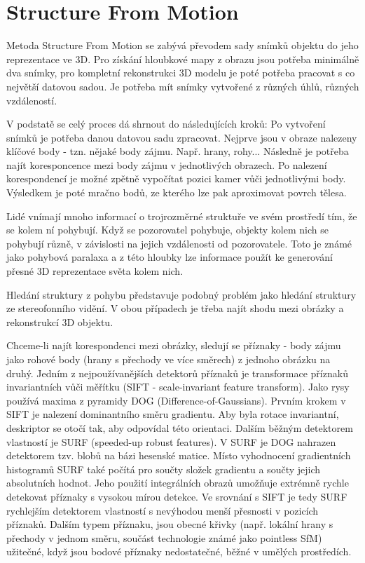 \section{Structure From Motion}
Metoda Structure From Motion se zabývá převodem sady snímků objektu do jeho reprezentace ve 3D. Pro získání hloubkové mapy z obrazu jsou potřeba minimálně dva snímky, pro kompletní rekonstrukci 3D modelu je poté potřeba pracovat s co největší datovou sadou. Je potřeba mít snímky vytvořené z různých úhlů, různých vzdáleností. \par
V podstatě se celý proces dá shrnout do následujících kroků: Po vytvoření snímků je potřeba danou datovou sadu zpracovat. Nejprve jsou v obraze nalezeny klíčové body - tzn. nějaké body zájmu. Např. hrany, rohy... Následně je potřeba najít koresponcence mezi body zájmu v jednotlivých obrazech. Po nalezení korespondencí je možné zpětně vypočítat pozici kamer vůči jednotlivými body. Výsledkem je poté mračno bodů, ze kterého lze pak aproximovat povrch tělesa.

Lidé vnímají mnoho informací o trojrozměrné struktuře ve svém prostředí tím, že se kolem ní pohybují. Když se pozorovatel pohybuje, objekty kolem nich se pohybují různě, v závislosti na jejich vzdálenosti od pozorovatele. Toto je známé jako pohybová paralaxa a z této hloubky lze informace použít ke generování přesné 3D reprezentace světa kolem nich.

Hledání struktury z pohybu představuje podobný problém jako hledání struktury ze stereofonního vidění. V obou případech je třeba najít shodu mezi obrázky a rekonstrukcí 3D objektu.

Chceme-li najít korespondenci mezi obrázky, sledují se příznaky - body zájmu jako rohové body (hrany s přechody ve více směrech) z jednoho obrázku na druhý. Jedním z nejpoužívanějších detektorů příznaků je transformace příznaků invariantních vůči měřítku (SIFT - scale-invariant feature transform). Jako rysy používá maxima z pyramidy DOG (Difference-of-Gaussians). Prvním krokem v SIFT je nalezení dominantního směru gradientu. Aby byla rotace invariantní, deskriptor se otočí tak, aby odpovídal této orientaci. Dalším běžným detektorem vlastností je SURF (speeded-up robust features). V SURF je DOG nahrazen detektorem tzv. blobů na bázi hesenské matice. Místo vyhodnocení gradientních histogramů SURF také počítá pro součty složek gradientu a součty jejich absolutních hodnot. Jeho použití integrálních obrazů umožňuje extrémně rychle detekovat příznaky s vysokou mírou detekce. Ve srovnání s SIFT je tedy SURF rychlejším detektorem vlastností s nevýhodou menší přesnosti v pozicích příznaků. Dalším typem příznaku, jsou obecné křivky (např. lokální hrany s přechody v jednom směru, součást technologie známé jako pointless SfM) užitečné, když jsou bodové příznaky nedostatečné, běžné v umělých prostředích.

